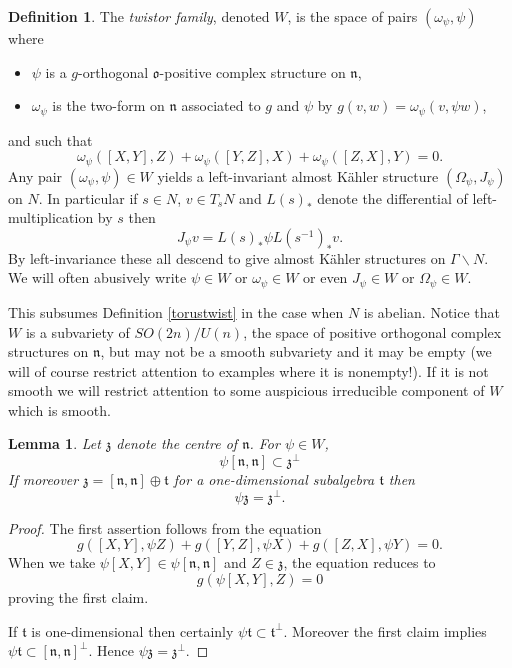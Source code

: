 \documentclass[11pt]{amsart}
\newcommand{\WW}{W}
\newcommand{\nilman}{\Gamma\backslash N}
\newcommand{\orient}{\mathfrak{o}}
\newcommand{\nn}{\mathfrak{n}}
\newcommand{\zz}{\mathfrak{z}}
\renewcommand{\tt}{\mathfrak{t}}
\numberwithin{equation}{section}
\newtheorem{lma}[equation]{Lemma}
\theoremstyle{definition}
\newtheorem{dfn}[equation]{Definition}
\theoremstyle{remark}
\begin{document}
\begin{dfn}\label{dfn:twist}
The \emph{twistor family}, denoted $\WW$, is the space of pairs $(\omega_{\psi},\psi)$ where
\begin{itemize}
\item $\psi$ is a $g$-orthogonal $\orient$-positive complex structure on $\nn$,
\item $\omega_{\psi}$ is the two-form on $\nn$ associated to $g$ and $\psi$ by $g(v,w)=\omega_{\psi}(v,\psi w)$,
\end{itemize}
and such that
\[\omega_{\psi}([X,Y],Z)+\omega_{\psi}([Y,Z],X)+\omega_{\psi}([Z,X],Y)=0.\]
Any pair $(\omega_{\psi},\psi)\in\WW$ yields a left-invariant almost K\"{a}hler structure $(\Omega_{\psi},J_{\psi})$ on $N$. In particular if $s\in N$, $v\in T_sN$ and $L(s)_*$ denote the differential of left-multiplication by $s$ then
\begin{equation}\label{jdef}J_{\psi}v=L(s)_*\psi L(s^{-1})_*v.\end{equation}
By left-invariance these all descend to give almost K\"{a}hler structures on $\nilman$. We will often abusively write $\psi\in\WW$ or $\omega_{\psi}\in\WW$ or even $J_{\psi}\in\WW$ or $\Omega_{\psi}\in\WW$.
\end{dfn}
This subsumes Definition \ref{torustwist} in the case when $N$ is abelian. Notice that $\WW$ is a subvariety of $SO(2n)/U(n)$, the space of positive orthogonal complex structures on $\nn$, but may not be a smooth subvariety and it may be empty (we will of course restrict attention to examples where it is nonempty!). If it is not smooth we will restrict attention to some auspicious irreducible component of $\WW$ which is smooth.
\begin{lma}\label{twist}
Let $\zz$ denote the centre of $\nn$. For $\psi\in\WW$,
\[\psi[\nn,\nn]\subset\zz^{\perp}\]
If moreover $\zz=[\nn,\nn]\oplus\tt$ for a one-dimensional subalgebra $\tt$ then
\[\psi\zz=\zz^{\perp}.\]
\end{lma}
\begin{proof}
The first assertion follows from the equation
\[g([X,Y],\psi Z)+g([Y,Z],\psi X)+g([Z,X],\psi Y)=0.\]
When we take $\psi[X,Y]\in\psi[\nn,\nn]$ and $Z\in\zz$, the equation reduces to
\[g(\psi[X,Y],Z)=0\]
proving the first claim.

If $\tt$ is one-dimensional then certainly $\psi\tt\subset\tt^{\perp}$. Moreover the first claim implies $\psi\tt\subset[\nn,\nn]^{\perp}$. Hence $\psi\zz=\zz^{\perp}$.
\end{proof}
\end{document}
